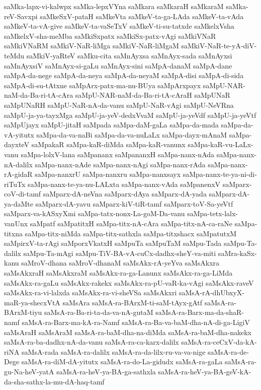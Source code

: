 {saMka-lapx-vi-kalwpx
saMka-lepxVYna
saMkara
saMkaraH
saMkaraM
saMka-reV-Savxpi
saMkeSxV-pataH
saMkeVta
saMkeV-ta-ga-LAda
saMkeV-ta-vAda
saMkeV-ta-vA-give
saMkeV-ta-vaSeTxV
saMkeV-ti-su-tatxde
saMkelxVsha
saMkelxV-sha-meMba
saMkiSxpatx
saMkiSx-patx-vAgi
saMkiVNaR
saMkiVNaRM
saMkiV-NaR-liMga
saMkiV-NaR-liMgaM
saMkiV-NaR-te-yA-diV-teMdu
saMkiV-yaRteV
saMku-cita
saMnAyxsa
saMnAyx-sada
saMnAyxsi
saMnAyxsiV
saMnAyx-si-gaLu
saMnAyx-sini
saMpA-danaM
saMpA-dane
saMpA-da-nege
saMpA-da-neya
saMpA-da-neyaM
saMpA-disi
saMpA-di-sida
saMpA-di-su-tAtxne
saMpArx-patx-ma-nu-BUya
saMpArxpayx
saMpU-NAR-naM-da-Ba-ri-tA-cAra
saMpU-NAR-naM-da-Ba-ri-tA-cAraH
saMpUNaR
saMpUNaRH
saMpU-NaR-nA-da-vanu
saMpU-NaR-vAgi
saMpU-NeVRna
saMpU-ja-ya-tayxMga
saMpU-ja-yeV-dedxVvaM
saMpU-ja-yeVdf
saMpU-ja-yeVtf
saMpUjayx
saMpU-jitaH
saMpada
saMpa-daM-gaLa
saMpa-da-mada
saMpa-da-vA-yitutx
saMpa-da-va-naBi
saMpa-da-va-nuLaLx
saMpa-dayx-mAnaM
saMpa-dayxteV
saMpakaR
saMpa-kaR-diMda
saMpa-kaR-vanunx
saMpa-kaR-vu-LaLx-vanu
saMpa-lolxV-lana
saMpananx
saMpananxH
saMpa-nanx-nAda
saMpa-nanx-nA-dalilx
saMpa-nanx-nAde
saMpa-nanx-nAgi
saMpa-nanx-rAda
saMpa-nanx-rA-gidaR
saMpa-nanxrU
saMpa-nanxru
saMpa-nanxsayx
saMpa-nanx-te-ya-ni-di-riTuTx
saMpa-nanx-te-ya-nu-LALxta
saMpa-nanx-vAda
saMpanenxV
saMparx-coV-di-tamf
saMparx-dA-neVna
saMparx-dAya
saMparx-dA-yada
saMparx-dA-ya-daMte
saMparx-dA-yavu
saMparx-kiV-tiR-tamf
saMparx-toV-Sa-yeVtf
saMparx-va-kASxyXmi
saMpa-tatx-nonx-La-goM-Da-vanu
saMpa-tetx-lalx-vanUnx
saMpatf
saMpatitxH
saMpa-titx-nA-cAra
saMpa-titx-nA-ca-raNe
saMpa-titxna
saMpa-titx-niMda
saMpa-titx-sathxla
saMpa-titxshacx
saMpatutxM
saMpirxV-ta-rAgi
saMporxVkatxH
saMpuTa
saMpuTaM
saMpu-Tada
saMpu-Ta-dalilx
saMpu-Ta-mAgi
saMpu-TiV-BA-vA-cuCx-dadhx-sheY-va-miti
saMra-kaSx-kanu
saMroV-dhana
saMroV-dhanaM
saMsAkx-rA-yeYva
saMsAkxra
saMsAkxraH
saMsAkxraM
saMsAkx-ra-ga-Lanunx
saMsAkx-ra-ga-LiMda
saMsAkx-ra-gaLu
saMsAkx-rakekx
saMsAkx-ra-pU-vaR-ka-vAgi
saMsAkx-raveV
saMsAkx-ra-vi-lalxda
saMsAkx-ra-vi-sheVSa
saMsAkxri
saMsA-rA-dhUbxyX-maR-ya-shecxVtA
saMsAra
saMsA-ra-BArxM-ti-saM-tAyx-gAtf
saMsA-ra-BArxM-tiyu
saMsA-ra-Ba-ri-ta-da-va-nA-gutaM
saMsA-ra-Barx-ma-da-shaR-namf
saMsA-ra-Barx-ma-kA-ra-Namf
saMsA-ra-Ba-va-baM-dha-nA-di-ga-LigiV
saMsAraH
saMsAraM
saMsA-ra-baM-dha-na-diMda
saMsA-ra-baM-dha-nakekx
saMsA-ra-ba-dadhx-nA-da-vanu
saMsA-ra-ca-karx-dalilx
saMsA-ra-ceCxV-da-kA-riNA
saMsA-rada
saMsA-ra-dalilx
saMsA-ra-da-lilx-ru-va-va-nige
saMsA-ra-de-Dege
saMsA-ra-diM-dA-yitutx
saMsA-ra-do-La-gidudx
saMsA-ra-gaLa
saMsA-ra-gu-Na-heV-yatA
saMsA-ra-heV-ya-BA-ga-sathxla
saMsA-ra-heV-ya-BA-geV-kA-da-sha-sathx-la-mu-dA-haq-tamf
}
